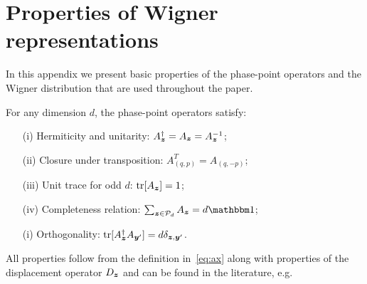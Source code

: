 \documentclass[pra,
aps,
twocolumn,
superscriptaddress,
groupedaddress,
nofootinbib,
reprint
]{revtex4-1}
\begin{document}

\appendix
\newpage
\section{Properties of Wigner representations}
\label{app:wigner}

In this appendix we present basic properties of the phase-point operators and the Wigner distribution that are used throughout the paper.

\begin{proposition}\label{thm:aproperties}
    For any dimension $d$, the phase-point operators satisfy:
    \begin{enumerate}
        \item[(i)]\label{en:a1} Hermiticity and unitarity: $A_{\bm{z}}^\dagger = A_{\bm{z}} = A_{\bm{z}}^{-1}$;
	    \item[(ii)]\label{en:a2} Closure under transposition: $A_{(q, p)}^T = A_{(q, -p)}$;
	    \item[(iii)]\label{en:a3} Unit trace for odd $d$: $\mbox{tr}[A_{\bm{z}}] = 1$;
	    \item[(iv)]\label{en:a4} Completeness relation: $\sum_{\bmz \in \cal{P}_d} A_{\bmz} = d\id$;
	    \item[(i)]\label{en:a5} Orthogonality: $\mbox{tr}[A_{\bm{z}}^\dagger A_{\bm{y}'}] = d \delta_{\bm{z},\bm{y}'}$.
	\end{enumerate}
\end{proposition}
All properties follow from the definition in~\cref{eq:ax} along with properties of the displacement operator $D_{\bm{z}}$ and can be found in the literature, e.g.~\cite{cit:veitch,Vourdas_2004,cit:gross3}
\end{document}
